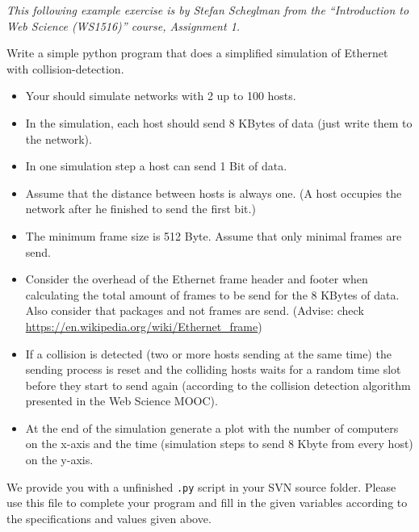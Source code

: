 \documentclass{WeSTassignment}
\begin{document}
\emph{This following example exercise is by Stefan Scheglman from the
  \enquote{Introduction to Web Science (WS1516)} course, Assignment 1.}

Write a simple python program that does a simplified simulation of Ethernet with
collision-detection.

\begin{itemize}
  \item Your should simulate networks with 2 up to 100 hosts.
  \item In the simulation, each host should send 8 KBytes of data (just write
    them to the network).
  \item In one simulation step a host can send 1 Bit of data.
  \item Assume that the distance between hosts is always one. (A host occupies
    the network after he finished to send the first bit.)
  \item The minimum frame size is 512 Byte. Assume that only minimal frames are
    send.
  \item Consider the overhead of the Ethernet frame header and footer when
    calculating the total amount of frames to be send for the 8 KBytes of data.
    Also consider that packages and not frames are send. (Advise: check
    \url{https://en.wikipedia.org/wiki/Ethernet_frame})
  \item If a collision is detected (two or more hosts sending at the same time)
    the sending process is reset and the colliding hosts waits for a random time
    slot before they start to send again (according to the collision detection
    algorithm presented in the Web Science MOOC).
  \item At the end of the simulation generate a plot with the number of
    computers on the x-axis and the time (simulation steps to send 8 Kbyte from
    every host) on the y-axis.
\end{itemize}

We provide you with a unfinished \texttt{.py} script in your SVN source folder.
Please use this file to complete your program and fill in the given variables
according to the specifications and values given above.

\makefooter
\end{document}
